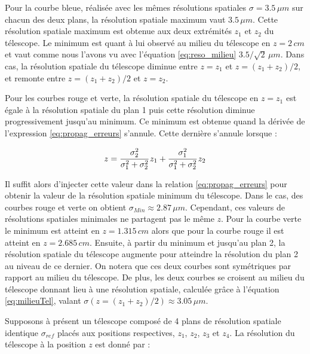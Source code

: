   Pour la courbe bleue, r\'ealis\'ee avec les m\^emes r\'esolutions spatiales $\sigma = 3.5 \, \mu m$ sur chacun des deux plans, la r\'esolution spatiale maximum vaut $3.5 \, \mu m$. Cette r\'esolution spatiale maximum est obtenue aux deux extr\'emit\'es $z_1$ et $z_2$ du t\'elescope. Le minimum est quant \`a lui observ\'e au milieu du t\'elescope en $z=2 \, cm$ et vaut comme nous l'avons vu avec l'\'equation \ref{eq:reso_milieu} $3.5/\sqrt{2} \, \mu m$. Dans cas, la r\'esolution spatiale du t\'elescope diminue entre $z=z_1$ et $z=(z_1+z_2)/2$, et remonte entre $z=(z_1+z_2)/2$ et $z=z_2$.
  
  \medskip
  
  Pour les courbes rouge et verte, la r\'esolution spatiale du t\'elescope en $z=z_1$ est \'egale \`a la r\'esolution spatiale du plan 1 puis cette r\'esolution diminue progressivement jusqu'au minimum. Ce minimum est obtenue quand la d\'eriv\'ee de l'expression \ref{eq:propag_erreurs} s'annule. Cette derni\`ere s'annule lorsque :
  
  \begin{equation}
   z = \cfrac{\sigma_2^2}{\sigma_1^2+\sigma_2^2} \, z_1 +  \cfrac{\sigma_1^2}{\sigma_1^2+\sigma_2^2} \, z_2
  \end{equation}

  Il suffit alors d'injecter cette valeur dans la relation \ref{eq:propag_erreurs} pour obtenir la valeur de la r\'esolution spatiale minimum du t\'elescope. Dans le cas, des courbes rouge et verte on obtient $\sigma_{Min} \approx 2.87 \, \mu m$. Cependant, ces valeurs de r\'esolutions spatiales minimales ne partagent pas le m\^eme $z$. Pour la courbe verte le minimum est atteint en $z=1.315 \, cm$ alors que pour la courbe rouge il est atteint en $z=2.685 \, cm$. Ensuite, \`a partir du minimum et jusqu'au plan 2, la r\'esolution spatiale du t\'elescope augmente pour atteindre la r\'esolution du plan 2 au niveau de ce dernier. On notera que ces deux courbes sont sym\'etriques par rapport au milieu du t\'elescope. De plus, les deux courbes se croisent au milieu du t\'elescope donnant lieu \`a une r\'esolution spatiale, calcul\'ee gr\^ace \`a l'\'equation \ref{eq:milieuTel}, valant $\sigma(z=(z_1+z_2)/2) \approx 3.05 \, \mu m$. 
 
  \medskip
  
  Supposons \`a pr\'esent un t\'elescope compos\'e de 4 plans de r\'esolution spatiale identique $\sigma_{ref}$ plac\'es aux positions respectives, $z_1$, $z_2$, $z_3$ et $z_4$. La r\'esolution du t\'elescope \`a la position $z$ est donn\'e par : 
  
